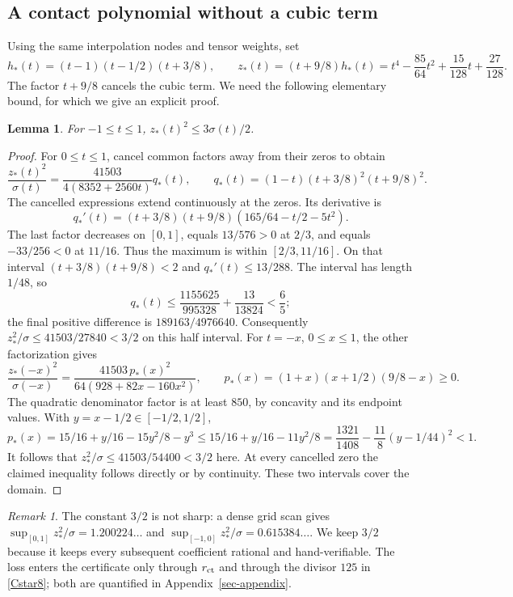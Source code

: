 \documentclass[11pt]{article}
\newtheorem{lemma}[theorem]{Lemma}
\theoremstyle{remark}\newtheorem{remark}[theorem]{Remark}
\numberwithin{equation}{section}
\begin{document}
\subsection{A contact polynomial without a cubic term}
Using the same interpolation nodes and tensor weights, set
\[
 h_*(t)=(t-1)(t-1/2)(t+3/8),\qquad
 z_*(t)=(t+9/8)h_*(t)
       =t^4-\frac{85}{64}t^2+\frac{15}{128}t+\frac{27}{128}.
\]
The factor $t+9/8$ cancels the cubic term. We need the following elementary
bound, for which we give an explicit proof.
\begin{lemma}\label{contact-square}
For $-1\le t\le1$, $z_*(t)^2\le3\sigma(t)/2$.
\end{lemma}
\begin{proof}
For $0\le t\le1$, cancel common factors away from their zeros to obtain
\[
 \frac{z_*(t)^2}{\sigma(t)}
  =\frac{41503}{4(8352+2560t)}q_*(t),\qquad
 q_*(t)=(1-t)(t+3/8)^2(t+9/8)^2.
\]
The cancelled expressions extend continuously at the zeros. Its derivative is
\[
 q_*'(t)=(t+3/8)(t+9/8)(165/64-t/2-5t^2).
\]
The last factor decreases on $[0,1]$, equals $13/576>0$ at $2/3$,
and equals $-33/256<0$ at $11/16$. Thus the maximum is within
$[2/3,11/16]$. On that interval $(t+3/8)(t+9/8)<2$ and
$q_*'(t)\le13/288$. The interval has length $1/48$, so
\[
 q_*(t)\le\frac{1155625}{995328}+\frac{13}{13824}<\frac65;
\]
the final positive difference is $189163/4976640$.
Consequently $z_*^2/\sigma\le41503/27840<3/2$ on this half interval.
For $t=-x$, $0\le x\le1$, the other factorization gives
\[
 \frac{z_*(-x)^2}{\sigma(-x)}
 =\frac{41503\,p_*(x)^2}{64(928+82x-160x^2)},\qquad
 p_*(x)=(1+x)(x+1/2)(9/8-x)\ge0.
\]
The quadratic denominator factor is at least $850$, by concavity and its
endpoint values. With $y=x-1/2\in[-1/2,1/2]$,
\[
 p_*(x)=15/16+y/16-15y^2/8-y^3
 \le15/16+y/16-11y^2/8
 =\frac{1321}{1408}-\frac{11}{8}(y-1/44)^2<1.
\]
It follows that $z_*^2/\sigma\le41503/54400<3/2$ here.
At every cancelled zero the claimed inequality follows directly or by
continuity. These two intervals cover the domain.
\end{proof}

\begin{remark}\label{rem-theta}
The constant $3/2$ is not sharp: a dense grid scan gives
$\sup_{[0,1]}z_*^2/\sigma=1.200224\ldots$ and
$\sup_{[-1,0]}z_*^2/\sigma=0.615384\ldots$. We keep $3/2$ because it keeps
every subsequent coefficient rational and hand-verifiable. The loss enters
the certificate only through $r_{\rm ct}$ and through the divisor $125$ in
\eqref{Cstar8}; both are quantified in Appendix~\ref{sec-appendix}.
\end{remark}
\end{document}

